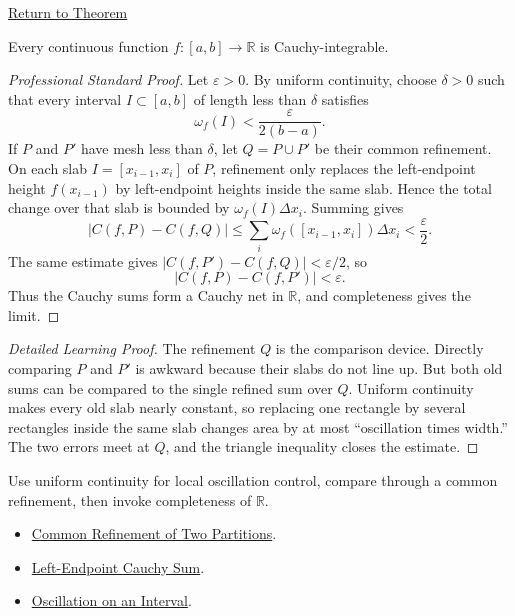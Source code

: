 \newpage
{}
\label{prf:continuous-cauchy-integrable}
\begin{remark*}[Return]\hyperref[thm:continuous-cauchy-integrable]{Return to Theorem}\end{remark*}
\begin{theorem*}
Every continuous function \(f:[a,b]\to\mathbb{R}\) is Cauchy-integrable.
\end{theorem*}
\begin{proof}[Professional Standard Proof]
\LRAProofBodyStart
Let \(\varepsilon>0\). By uniform continuity, choose \(\delta>0\) such that
every interval \(I\subset[a,b]\) of length less than \(\delta\) satisfies
\[
  \omega_f(I)<\frac{\varepsilon}{2(b-a)}.
\]
If \(P\) and \(P'\) have mesh less than \(\delta\), let \(Q=P\cup P'\) be their
common refinement. On each slab \(I=[x_{i-1},x_i]\) of \(P\), refinement only
replaces the left-endpoint height \(f(x_{i-1})\) by left-endpoint heights
inside the same slab. Hence the total change over that slab is bounded by
\(\omega_f(I)\Delta x_i\). Summing gives
\[
  |C(f,P)-C(f,Q)|
  \le \sum_i \omega_f([x_{i-1},x_i])\Delta x_i
  < \frac{\varepsilon}{2}.
\]
The same estimate gives \(|C(f,P')-C(f,Q)|<\varepsilon/2\), so
\[
  |C(f,P)-C(f,P')|<\varepsilon.
\]
Thus the Cauchy sums form a Cauchy net in \(\mathbb R\), and completeness gives
the limit.
\end{proof}
\begin{proof}[Detailed Learning Proof]
\LRAProofBodyStart
The refinement \(Q\) is the comparison device. Directly comparing \(P\) and
\(P'\) is awkward because their slabs do not line up. But both old sums can be
compared to the single refined sum over \(Q\). Uniform continuity makes every
old slab nearly constant, so replacing one rectangle by several rectangles
inside the same slab changes area by at most ``oscillation times width.'' The
two errors meet at \(Q\), and the triangle inequality closes the estimate.
\end{proof}
\begin{remark*}
Use uniform continuity for local oscillation control, compare through a common
refinement, then invoke completeness of \(\mathbb{R}\).
\end{remark*}
\begin{dependencies}
\begin{itemize}
  \item \hyperref[lem:common-refinement-partitions]{Common Refinement of Two Partitions}.
  \item \hyperref[def:cauchy-sum]{Left-Endpoint Cauchy Sum}.
  \item \hyperref[def:interval-oscillation-integration]{Oscillation on an Interval}.
\end{itemize}
\end{dependencies}
\clearpage
